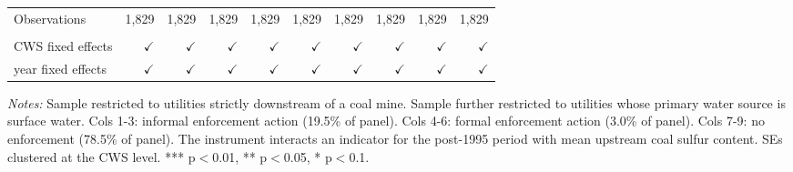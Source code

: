 \begin{table}[htbp]
\begin{adjustbox}{width = \textwidth, center}
\begin{tabular}{lrrrrrrrrr}
         Observations                                             & 1,829         & 1,829         & 1,829         & 1,829         & 1,829         & 1,829         & 1,829         & 1,829         & 1,829\\  
         
          \\
         
         CWS fixed effects                                        & $\checkmark$  & $\checkmark$  & $\checkmark$  & $\checkmark$  & $\checkmark$  & $\checkmark$  & $\checkmark$  & $\checkmark$  & $\checkmark$\\   
         year fixed effects                                       & $\checkmark$  & $\checkmark$  & $\checkmark$  & $\checkmark$  & $\checkmark$  & $\checkmark$  & $\checkmark$  & $\checkmark$  & $\checkmark$\\   
         
         \bottomrule
         
      \end{tabular}
      
      
      
   \end{adjustbox}
      {\tiny\linespread{1}\selectfont \par \raggedright 
   \textit{Notes:} Sample restricted to utilities strictly downstream of a coal mine. Sample further restricted to utilities whose primary water source is surface water. Cols 1-3: informal enforcement action (19.5\% of panel). Cols 4-6: formal enforcement action (3.0\% of panel). Cols 7-9: no enforcement (78.5\% of panel). The instrument interacts an indicator for the post-1995 period with mean upstream coal sulfur content. SEs clustered at the CWS level. *** p$<$0.01, ** p$<$0.05, * p$<$0.1.}
   
\end{table}


